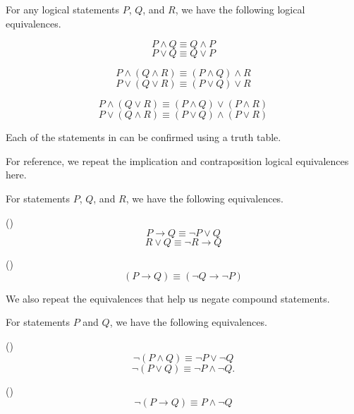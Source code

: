 \begin{thm}
\label{thm_logical_equiv_comm_assoc_dist}
For any logical statements $P$, $Q$, and $R$, we have the following logical equivalences.
    \begin{apart}
        \item \label{part_equiv_comm}  
        $$P \land Q \equiv Q \land P$$
        $$P \lor Q \equiv Q \lor P$$

        \item \label{part_equiv_assoc} 
        $$ P \land (Q \land R) \equiv (P \land Q) \land R$$
        $$ P \lor (Q \lor R) \equiv (P \lor Q) \lor R$$

        \item \label{part_equiv_dist} 
        $$ P \land (Q \lor R) \equiv (P \land Q) \lor (P \land R)$$
        $$ P \lor (Q \land R) \equiv (P \lor Q) \land (P \lor R)$$
    \end{apart}
\end{thm}

Each of the statements in  can be confirmed using a truth table.  

For reference, we repeat the implication and contraposition logical equivalences here. 

\begin{thm}
\label{thm_equiv_implication_cp__again}
    For statements $P$, $Q$, and $R$, we have the following equivalences.
        \begin{apart}
            \item \label{part_equiv_impl}  ()
                $$ P \to Q \equiv \neg P \lor Q$$
                $$ R \lor Q \equiv \neg R \to Q$$
            \item \label{part_equiv_cp}  ()
                $$(P \to Q) \equiv (\neg Q \to \neg P)$$
       \end{apart}
\end{thm}

We also repeat the equivalences that help us negate compound statements.

\begin{thm}
\label{thm_equiv_neg_and_or_ifthen}
    For statements $P$ and $Q$, we have the following equivalences.
        \begin{apart}
            \item {}  ()
                $$\neg(P \land Q) \equiv \neg P \lor \neg Q$$
                $$\neg(P \lor Q) \equiv \neg P \land \neg Q.$$  

            \item {} ()
                $$\neg(P \to Q) \equiv P \land \neg Q$$
        \end{apart}
\end{thm}

